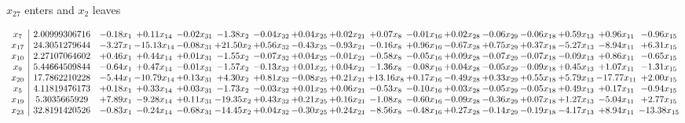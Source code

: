 \documentclass[9pt]{article}
\begin{document}
 $ x_{27} $ enters and $ x_{2} $ leaves 

 \[\begin{array}{c| c c@{\hskip 2pt} c@{\hskip 2pt} c@{\hskip 2pt} c@{\hskip 2pt} c@{\hskip 2pt} c@{\hskip 2pt} c@{\hskip 2pt} c@{\hskip 2pt} c@{\hskip 2pt} c@{\hskip 2pt} c@{\hskip 2pt} c@{\hskip 2pt} c@{\hskip 2pt} c@{\hskip 2pt} c@{\hskip 2pt} }
 x_{7}   &  2.00999306716 & -0.18 x_{1} & +  0.11 x_{14} & -0.02 x_{31} & -1.38 x_{2} & -0.04 x_{32} & +  0.04 x_{25} & +  0.02 x_{21} & +  0.07 x_{8} & -0.01 x_{16} & +  0.02 x_{28} & -0.06 x_{29} & -0.06 x_{18} & +  0.59 x_{13} & +  0.96 x_{11} & -0.96 x_{15}\\
 x_{17}   &  24.3051279644 & -3.27 x_{1} & -15.13 x_{14} & -0.08 x_{31} & + 21.50 x_{2} & +  0.56 x_{32} & -0.43 x_{25} & -0.93 x_{21} & -0.16 x_{8} & +  0.96 x_{16} & -0.67 x_{28} & +  0.75 x_{29} & +  0.37 x_{18} & -5.27 x_{13} & -8.94 x_{11} & +  6.31 x_{15}\\
 x_{10}   &  2.27107064602 & +  0.46 x_{1} & +  0.44 x_{14} & +  0.01 x_{31} & -1.55 x_{2} & -0.07 x_{32} & +  0.04 x_{25} & -0.01 x_{21} & -0.58 x_{8} & -0.05 x_{16} & +  0.09 x_{28} & -0.07 x_{29} & -0.07 x_{18} & -0.09 x_{13} & +  0.86 x_{11} & -0.65 x_{15}\\
 x_{9}   &  5.44664509844 & -0.64 x_{1} & +  0.47 x_{14} & -0.01 x_{31} & -1.57 x_{2} & -0.13 x_{32} & +  0.01 x_{25} & +  0.04 x_{21} & -1.36 x_{8} & -0.08 x_{16} & +  0.04 x_{28} & -0.05 x_{29} & -0.09 x_{18} & +  0.45 x_{13} & +  1.07 x_{11} & -1.31 x_{15}\\
 x_{20}   &  17.7862210228 & -5.44 x_{1} & -10.79 x_{14} & +  0.13 x_{31} & +  4.30 x_{2} & +  0.81 x_{32} & -0.08 x_{25} & +  0.21 x_{21} & + 13.16 x_{8} & +  0.17 x_{16} & -0.49 x_{28} & +  0.33 x_{29} & +  0.55 x_{18} & +  5.79 x_{13} & -17.77 x_{11} & +  2.00 x_{15}\\
 x_{5}   &  4.11819476173 & +  0.18 x_{1} & +  0.33 x_{14} & +  0.03 x_{31} & -1.73 x_{2} & -0.03 x_{32} & +  0.01 x_{25} & +  0.06 x_{21} & -0.53 x_{8} & -0.10 x_{16} & +  0.03 x_{28} & -0.05 x_{29} & -0.05 x_{18} & +  0.49 x_{13} & +  0.17 x_{11} & -0.94 x_{15}\\
 x_{19}   &  5.3035665929 & +  7.89 x_{1} & -9.28 x_{14} & +  0.11 x_{31} & -19.35 x_{2} & +  0.43 x_{32} & +  0.21 x_{25} & +  0.16 x_{21} & -1.08 x_{8} & -0.60 x_{16} & -0.09 x_{28} & -0.36 x_{29} & +  0.07 x_{18} & +  1.27 x_{13} & -5.04 x_{11} & +  2.77 x_{15}\\
 x_{23}   &  32.8191420526 & -0.83 x_{1} & -0.24 x_{14} & -0.68 x_{31} & -14.45 x_{2} & +  0.04 x_{32} & -0.30 x_{25} & +  0.24 x_{21} & -8.56 x_{8} & -0.48 x_{16} & +  0.27 x_{28} & -0.14 x_{29} & -0.19 x_{18} & -4.17 x_{13} & +  8.94 x_{11} & -13.38 x_{15}\\

\end{array}\]
\end{document}
